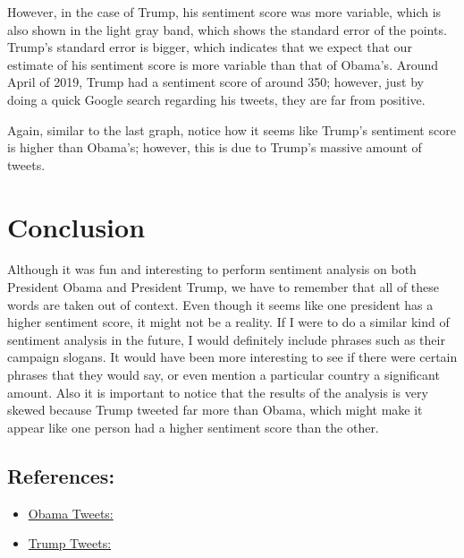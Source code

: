 \documentclass[
  letterpaper,
  DIV=11,
  numbers=noendperiod]{scrartcl}
\providecommand{\tightlist}{%
  \setlength{\itemsep}{0pt}\setlength{\parskip}{0pt}}
\begin{document}
However, in the case of Trump, his sentiment score was more variable,
which is also shown in the light gray band, which shows the standard
error of the points. Trump's standard error is bigger, which indicates
that we expect that our estimate of his sentiment score is more variable
than that of Obama's. Around April of 2019, Trump had a sentiment score
of around 350; however, just by doing a quick Google search regarding
his tweets, they are far from positive.

Again, similar to the last graph, notice how it seems like Trump's
sentiment score is higher than Obama's; however, this is due to Trump's
massive amount of tweets.

\section{Conclusion}\label{conclusion}

Although it was fun and interesting to perform sentiment analysis on
both President Obama and President Trump, we have to remember that all
of these words are taken out of context. Even though it seems like one
president has a higher sentiment score, it might not be a reality. If I
were to do a similar kind of sentiment analysis in the future, I would
definitely include phrases such as their campaign slogans. It would have
been more interesting to see if there were certain phrases that they
would say, or even mention a particular country a significant amount.
Also it is important to notice that the results of the analysis is very
skewed because Trump tweeted far more than Obama, which might make it
appear like one person had a higher sentiment score than the other.

\subsection{References:}\label{references}

\begin{itemize}
\tightlist
\item
  \href{https://www.kaggle.com/datasets/neelgajare/all-12000-president-obama-tweets}{Obama
  Tweets:}
\item
  \href{https://www.kaggle.com/datasets/zusmani/trumps-legacy}{Trump
  Tweets:}
\end{itemize}
\end{document}
